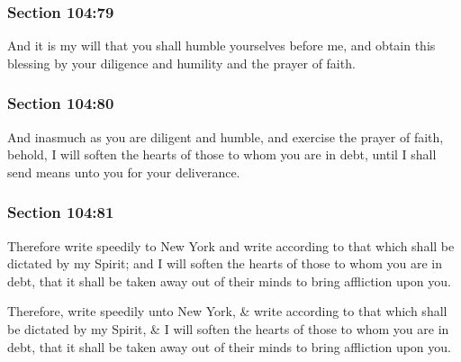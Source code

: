 	\subsubsection{Section 104:79} %
		\label{DC104-79}

		And it is my will that you shall humble yourselves before me, and obtain this blessing by your diligence and humility and the prayer of faith.


	\subsubsection{Section 104:80} %
		\label{DC104-80}

		And inasmuch as you are diligent and humble, and exercise the prayer of faith, behold, I will soften the hearts of those to whom you are in debt, until I shall send means unto you for your deliverance.


	\subsubsection{Section 104:81} %
		\label{DC104-81}

		Therefore write speedily to New York and write according to that which shall be dictated by my Spirit; and I will soften the hearts of those to whom you are in debt, that it shall be taken away out of their minds to bring affliction upon you.

		\begin{framed}
		\scriptsize
			\begin{compactdesc}
				\item[JSP] Therefore, write speedily unto New York, \& write according to that which shall be dictated by my Spirit, \& I will soften the hearts of those to whom you are in debt, that it shall be taken away out of their minds to bring affliction upon you.
			\end{compactdesc}
		\end{framed}

